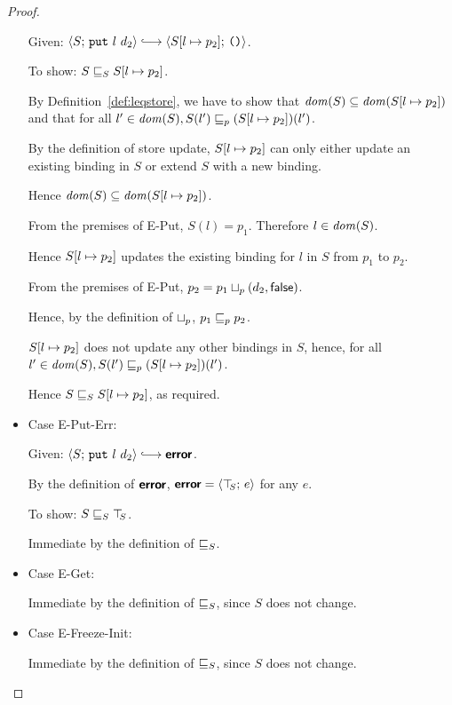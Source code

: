\begin{proof}
\begin{itemize}
      Given: $\config{S}{\putexp{l}{d_2}} \parstepsto
      \config{\extSRaw{S}{l}{p_2}}{\unit}$.

      To show: $S \sqsubseteq_S S[l \mapsto p_2]$.

      By Definition~\ref{def:leqstore}, we have to show that $\mathit{dom}(S)
      \subseteq \mathit{dom}(S[l \mapsto p_2])$ and that for all $l' \in
      \mathit{dom}(S), \\
      S(l') \sqsubseteq_p (S[l \mapsto p_2])(l')$.

      By the definition of store update, $S[l \mapsto p_2]$ can only
      either update an existing binding in $S$ or extend $S$ with a
      new binding.

      Hence $\mathit{dom}(S) \subseteq \mathit{dom}(S[l \mapsto p_2])$.

      From the premises of {\sc E-Put}, $S(l) = p_1$.  Therefore $l
      \in \mathit{dom}(S)$.

      Hence $S[l \mapsto p_2]$ updates the existing binding for $l$
      in $S$ from $p_1$ to $p_2$.

      From the premises of {\sc E-Put}, $p_2 =
      p_1 \sqcup_p (d_2, \textsf{false})$.

      Hence, by the definition of $ \sqcup_p $, $p_1 \sqsubseteq_p p_2$.

      $S[l \mapsto p_2]$ does not update any other bindings in $S$,
      hence, for all $l' \in \mathit{dom}(S), S(l') \sqsubseteq_p
      (S[l \mapsto p_2])(l')$.

      Hence $S \sqsubseteq_S S[l \mapsto p_2]$, as required.

    \item Case {\sc E-Put-Err}:

      Given: $\config{S}{\putexp{l}{d_2}} \parstepsto \error$.

      By the definition of $\textbf{\textsf{error}}$, $\textbf{\textsf{error}} = \langle \top\hspace{-0.85mm}_{S};\, e \rangle$ for
      any $e$.

      To show: $S \sqsubseteq_S \top\hspace{-0.85mm}_{S}$.

      Immediate by the definition of $ \sqsubseteq_S $.

    \item Case {\sc E-Get}:

      Immediate by the definition of $ \sqsubseteq_S $, since $S$ does
      not change.

    \item Case {\sc E-Freeze-Init}:

      Immediate by the definition of $ \sqsubseteq_S $, since $S$ does
      not change.


\end{itemize}
\end{proof}
